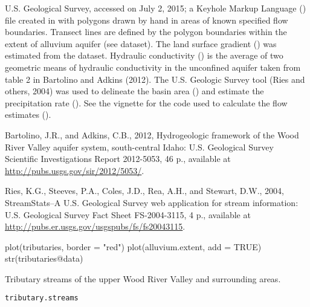 \documentclass[a4paper]{book}
\begin{document}
%
\begin{Source}\relax
U.S. Geological Survey, accessed on July 2, 2015;
a Keyhole Markup Language () file created in  with polygons drawn by hand in areas of known specified flow boundaries.
Transect lines are defined by the polygon boundaries within the extent of alluvium aquifer (see  dataset).
The land surface gradient () was estimated from the  dataset.
Hydraulic conductivity () is the average of two geometric means of hydraulic conductivity in the unconfined aquifer taken from table 2 in Bartolino and Adkins (2012).
The U.S. Geologic Survey  tool (Ries and others, 2004) was used to delineate the basin area () and estimate the precipitation rate ().
See the  vignette for the \R{} code used to calculate the flow estimates ().
\end{Source}
%
\begin{References}\relax
Bartolino, J.R., and Adkins, C.B., 2012, Hydrogeologic framework of the Wood River Valley aquifer system, south-central Idaho: U.S. Geological Survey Scientific Investigations Report 2012-5053, 46 p., available at \url{http://pubs.usgs.gov/sir/2012/5053/}.

Ries, K.G., Steeves, P.A., Coles, J.D., Rea, A.H., and Stewart, D.W., 2004, StreamStats--A U.S. Geological Survey web application for stream information: U.S. Geological Survey Fact Sheet FS-2004-3115, 4 p., available at \url{http://pubs.er.usgs.gov/usgspubs/fs/fs20043115}.
\end{References}
%
\begin{Examples}
\begin{ExampleCode}
plot(tributaries, border = "red")
plot(alluvium.extent, add = TRUE)
str(tributaries@data)
\end{ExampleCode}
\end{Examples}
%
\begin{Description}\relax
Tributary streams of the upper Wood River Valley and surrounding areas.
\end{Description}
%
\begin{Usage}
\begin{verbatim}
tributary.streams
\end{verbatim}
\end{Usage}
\end{document}
